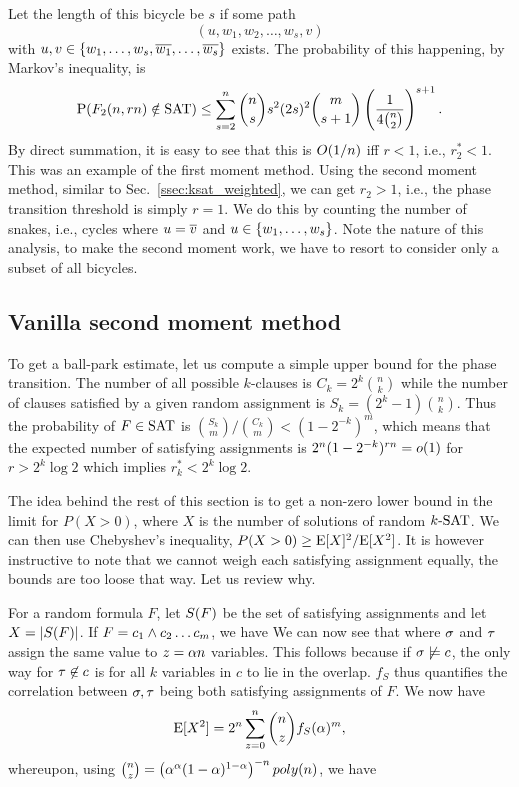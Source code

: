 \documentclass[letterpaper, 10pt, twocolumn, reqno]{amsart}
\begin{document}
Let the length of this bicycle be $s$ if some path
$$(u, w_1, w_2, \ldots, w_s, v)$$
with $u,v \in \{w_1, \ldots, w_s,\n{w_1}, \ldots, \n{w_s}\}$
exists. The probability of this happening, by Markov's inequality, is
$$
\P(F_2(n,rn) \notin \SAT) \leq \sum_{s=2}^n \binom{n}{s} s^2 (2s)^2 \binom{m}{s+1} \rbrac{\f{1}{4 \binom{n}{2}}}^{s+1}.
$$
By direct summation, it is easy to see that this is $\bigo(1/n)$ iff $r <1$, i.e., $r_2^* < 1$. This was an example of the first moment method. Using the second moment method, similar to Sec.~\ref{ssec:ksat_weighted}, we can get $r_2 > 1$, i.e., the phase transition threshold is simply $r = 1$. We do this by counting the number of snakes, i.e., cycles where $u = \n{v}$ and $u \in \cbrac{w_1, \ldots, w_s}$. Note the nature of this analysis, to make the second moment work, we have to resort to consider only a subset of all bicycles.

\subsection{Vanilla second moment method}
\label{ssec:ksat_vanilla}
To get a ball-park estimate, let us compute a simple upper bound for the phase
transition. The number of all possible $k$-clauses is $C_k = 2^k \binom{n}{k}$
 while the number of clauses satisfied by a given random assignment is $S_k = (2^k -1) \binom{n}{k}$. Thus the probability of $F \in \SAT$ is $\binom{S_k}{m}/\binom{C_k}{m} < (1-2^{-k})^m$, which means that the expected number of
satisfying assignments is $2^n (1-2^{-k})^{rn} = \smallo(1)$ for $r > 2^k \log 2$ which implies $r_k^* < 2^k \log 2$.

The idea behind the rest of this section is to get a non-zero lower bound in the limit for $P(X > 0)$, where $X$ is the number of solutions of random $\ksat$. We can then use Chebyshev's inequality, $P(X>0) \geq \E[X]^2/\E[X^2]$. It is however instructive to note that we cannot weigh each satisfying assignment equally, the bounds are too loose that way. Let us review why.

For a random formula $F$, let $\sf$ be the set of satisfying assignments and let $X = \abs{\sf}$. If $F = c_1 \aand c_2 \ldots c_m$, we have
We can now see that
where $\s$ and $\t$ assign the same value to $z = \a n$ variables. This follows because if $\s \not\sat c$, the only way for $\t \not\in c$ is for all $k$ variables in $c$ to lie in the overlap. $f_S$ thus quantifies the correlation between $\s,\t$ being both satisfying assignments of $F$. We now have
$$
\E[X^2] = 2^n \sum_{z=0}^n \binom{n}{z} f_S(\a)^m,
$$
whereupon, using $\binom{n}{z} = \rbrac{\a^\a (1-\a)^{1-\a}}^{-n} poly(n)$, we have
\end{document}
